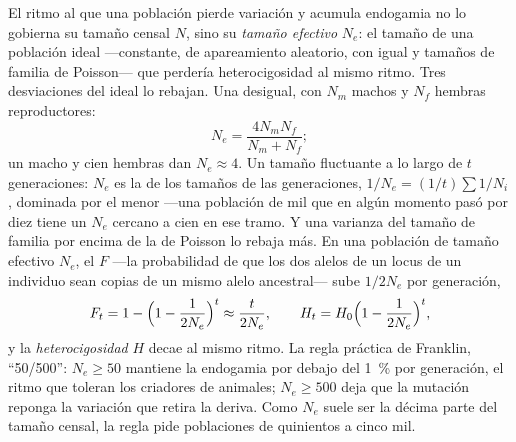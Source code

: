 \begin{theorem}\label{thm:b3:conservation-biology:ne}
El ritmo al que una población pierde variación y acumula endogamia no
lo gobierna su tamaño censal $N$, sino su \emph{tamaño efectivo}
$N_{e}$: el tamaño de una población ideal ---constante, de apareamiento
aleatorio, con  igual y tamaños de familia de
Poisson--- que perdería heterocigosidad al mismo ritmo. Tres
desviaciones del ideal lo rebajan. Una  desigual, con
$N_{m}$ machos y $N_{f}$ hembras reproductores:
\[
N_{e} = \frac{4N_{m}N_{f}}{N_{m} + N_{f}} ;
\]
un macho y cien hembras dan $N_{e} \approx 4$. Un tamaño fluctuante a lo
largo de $t$ generaciones: $N_{e}$ es la \emph{} de los
tamaños de las generaciones, $1/N_{e} = (1/t)\sum 1/N_{i}$, dominada por
el menor ---una población de mil que en algún momento pasó por diez
tiene un $N_{e}$ cercano a cien en ese tramo. Y una varianza del tamaño
de familia por encima de la de Poisson lo rebaja más. En una población
de tamaño efectivo $N_{e}$, el \emph{} $F$ ---la
probabilidad de que los dos alelos de un locus de un individuo sean
copias de un mismo alelo ancestral--- sube $1/2N_{e}$ por generación,
\[
F_{t} = 1 - \Bigl(1 - \frac{1}{2N_{e}}\Bigr)^{t} \approx \frac{t}{2N_{e}},
\qquad H_{t} = H_{0}\Bigl(1 - \frac{1}{2N_{e}}\Bigr)^{t} ,
\]
y la \emph{heterocigosidad} $H$ decae al mismo ritmo. La regla práctica
de Franklin, ``50/500'': $N_{e} \ge 50$ mantiene la endogamia por debajo
del \qty{1}{\%} por generación, el ritmo que toleran los criadores de
animales; $N_{e} \ge
500$ deja que la mutación reponga la variación que retira la deriva.
Como $N_{e}$ suele ser la décima parte del tamaño censal, la regla pide
poblaciones de quinientos a cinco mil.
\end{theorem}
